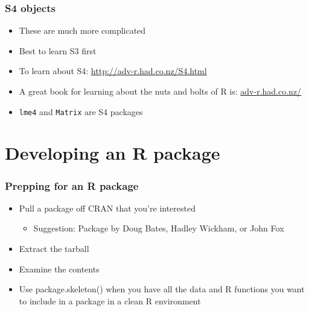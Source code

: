 \documentclass[xcolor=svgnames]{beamer}\usepackage[]{graphicx}\usepackage[]{color}
\begin{document}
\begin{frame}
  \frametitle{S4 objects}
  \begin{itemize}
    \item These are much more complicated
      \item Best to learn S3 first
        \item To learn about S4: \url{http://adv-r.had.co.nz/S4.html}
          \item A great book for learning about the nuts and bolts of R is: \url{adv-r.had.co.nz/}
            \item \texttt{lme4} and \texttt{Matrix} are S4 packages
      
  \end{itemize}
\end{frame}

\section{Developing an R package}

\begin{frame}
\frametitle{Prepping for an R package}
\begin{itemize}
  \item Pull a package off CRAN that you're interested
    \begin{itemize}
      \item Suggestion: Package by Doug Bates, Hadley Wickham, or John Fox
    \end{itemize}
  \item Extract the tarball
  \item Examine the contents
  \item Use package.skeleton() when you have all the data and R functions you want to include in a package in a clean R environment
    \end{itemize}
\end{frame}
\end{document}
